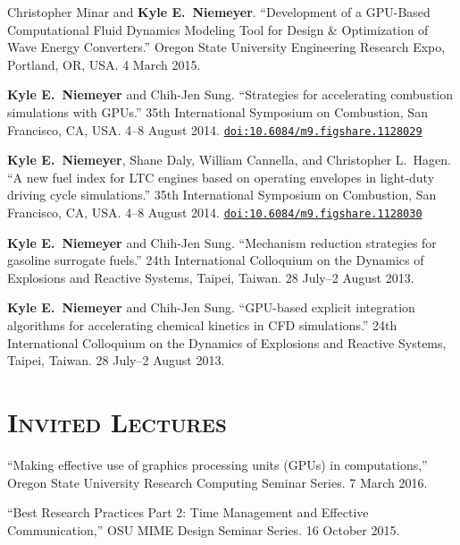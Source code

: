 \documentclass[margin,line,11pt]{res}
\makeatletter
\newlength{\bibhang}
\newlength{\bibsep}
 {\@listi \global\bibsep\itemsep \global\advance\bibsep by\parsep}
\newenvironment{bibenum*}
  {\renewcommand\labelenumi{\theenumi.}%
   \etaremune[
     topsep=0pt,
     itemsep=\bibsep,
     parsep=0pt,partopsep=0pt,
     itemindent=-\bibhang,
     leftmargin={\bibhang+\widthof{[999]}}]}
  {\endetaremune}
\newcommand*{\doi}[1]{\href{http://dx.doi.org/#1}{\nolinkurl{doi:#1}}}
\makeatother
\begin{document}
\begin{resume}
\begin{bibenum*}
\item Christopher Minar and \textbf{Kyle E.\ Niemeyer}.
``Development of a GPU-Based Computational Fluid Dynamics Modeling Tool for Design \& Optimization of Wave Energy Converters.''
Oregon State University Engineering Research Expo, Portland, OR, USA.
4 March 2015.

\item \textbf{Kyle E.\ Niemeyer} and Chih-Jen Sung.
``Strategies for accelerating combustion simulations with GPUs.''
35th International Symposium on Combustion, San Francisco, CA, USA.
4--8 August 2014.
\doi{10.6084/m9.figshare.1128029}

\item \textbf{Kyle E.\ Niemeyer}, Shane Daly, William Cannella, and Christopher L.\ Hagen.
``A new fuel index for LTC engines based on operating envelopes in light-duty driving cycle simulations.''
35th International Symposium on Combustion, San Francisco, CA, USA.
4--8 August 2014.
\doi{10.6084/m9.figshare.1128030}

\item \textbf{Kyle E.\ Niemeyer} and Chih-Jen Sung.
``Mechanism reduction strategies for gasoline surrogate fuels.''
24th International Colloquium on the Dynamics of Explosions and Reactive Systems, Taipei, Taiwan.
28 July--2 August 2013.

\item \textbf{Kyle E.\ Niemeyer} and Chih-Jen Sung.
``GPU-based explicit integration algorithms for accelerating chemical kinetics in CFD simulations.''
24th International Colloquium on the Dynamics of Explosions and Reactive Systems, Taipei, Taiwan.
28 July--2 August 2013.

\end{bibenum*}

\section{\textsc{Invited Lectures}}

\begin{bibenum*}
\item ``Making effective use of graphics processing units (GPUs) in computations,'' Oregon State University Research Computing Seminar Series. 7 March 2016.

\item ``Best Research Practices Part 2: Time Management and Effective Communication,'' OSU MIME Design Seminar Series. 16 October 2015.


\end{bibenum*}
\end{resume}
\end{document}
